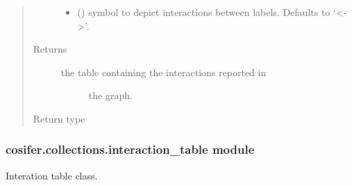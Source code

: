 \documentclass[letterpaper,10pt,english]{sphinxmanual}
\begin{document}
\begin{fulllineitems}
\begin{fulllineitems}
\begin{quote}
\begin{description}
\begin{itemize}
\item {} 
 (\sphinxstyleliteralemphasis{\sphinxupquote{, }}) \textendash{} symbol to depict interactions
between labels. Defaults to ‘\textless{}-\textgreater{}’.

\end{itemize}

\item[{Returns}] \leavevmode
\begin{description}
\item[{the table containing the interactions reported in}] \leavevmode
the graph.

\end{description}


\item[{Return type}] \leavevmode
{\hyperref[\detokenize{_modules/cosifer.collections:cosifer.collections.interaction_table.InteractionTable}]{}}

\end{description}\end{quote}

\end{fulllineitems}


\end{fulllineitems}



\subsubsection{cosifer.collections.interaction\_table module}
\label{\detokenize{_modules/cosifer.collections:module-cosifer.collections.interaction_table}}\label{\detokenize{_modules/cosifer.collections:cosifer-collections-interaction-table-module}}
Interation table class.
\end{document}
